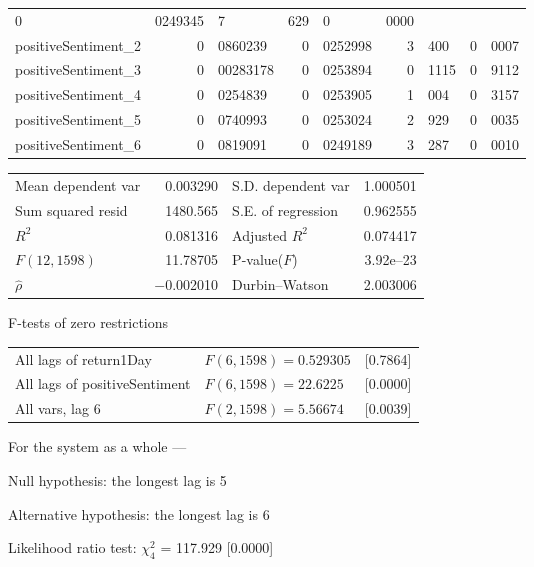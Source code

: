 \begin{center}
\begin{longtable}{lr@{.}lr@{.}lr@{.}lr@{.}l}
    0&0249345 &
        7&629 &
        0&0000 \\
positiveSentiment\_2 &
    0&0860239 &
    0&0252998 &
        3&400 &
        0&0007 \\
positiveSentiment\_3 &
    0&00283178 &
    0&0253894 &
        0&1115 &
        0&9112 \\
positiveSentiment\_4 &
    0&0254839 &
    0&0253905 &
        1&004 &
        0&3157 \\
positiveSentiment\_5 &
    0&0740993 &
    0&0253024 &
        2&929 &
        0&0035 \\
positiveSentiment\_6 &
    0&0819091 &
    0&0249189 &
        3&287 &
        0&0010 \\
\end{longtable}

\begin{tabular}{lrlr}
Mean dependent var &  0.003290 & S.D. dependent var &  1.000501 \\
Sum squared resid &  1480.565 & S.E. of regression &  0.962555 \\
$R^2$ &  0.081316 & Adjusted $R^2$ &  0.074417 \\
$F(12, 1598)$ &  11.78705 & P-value($F$) &  3.92\textrm{e--23} \\
$\hat{\rho}$ & $-$0.002010 & Durbin--Watson &  2.003006 \\
\end{tabular}

\end{center}

\begin{center}
F-tests of zero restrictions\\[1em]
\begin{tabular}{lll}
All lags of return1Day & $F(6, 1598) = 0.529305$ & [0.7864]\\
All lags of positiveSentiment & $F(6, 1598) = 22.6225$ & [0.0000]\\
All vars, lag 6 & $F(2, 1598) = 5.56674$ & [0.0039]\\
\end{tabular}
\end{center}

\noindent For the system as a whole ---\par
Null hypothesis: the longest lag is 5\par
Alternative hypothesis: the longest lag is 6\par
Likelihood ratio test: $\chi^2_{4}$ = 117.929 [0.0000]\par    

